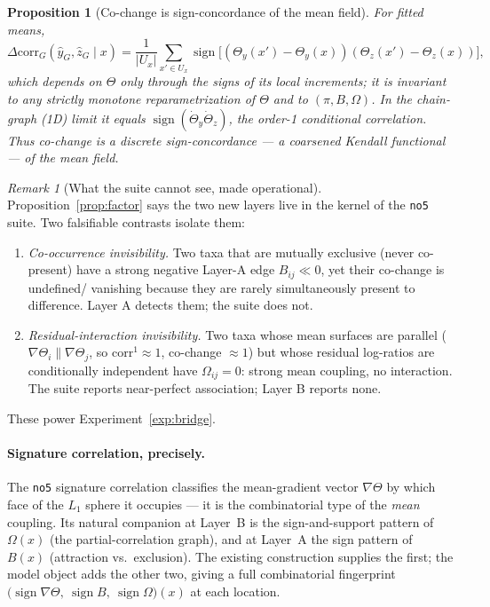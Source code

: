 \documentclass[11pt]{article}
\theoremstyle{definition}
\theoremstyle{plain}
\newtheorem{proposition}[definition]{Proposition}
\theoremstyle{remark}
\newtheorem{remark}[definition]{Remark}
\newcommand{\sign}{\operatorname{sign}}
\newcommand{\1}{\mathbf{1}}
\newcommand{\Prec}{\Omega}
\newcommand{\Pres}{\pi}
\newcommand{\Edge}{B}
\newcommand{\dcorr}{\Delta\mathrm{corr}}
\begin{document}
\begin{proposition}[Co-change is sign-concordance of the mean field]\label{prop:cochange}
For fitted means,
\[
  \dcorr_G(\widehat y_G,\widehat z_G\mid x)=\frac{1}{|U_x|}
  \sum_{x'\in U_x}\sign\!\big[(\Theta_y(x')-\Theta_y(x))
                                (\Theta_z(x')-\Theta_z(x))\big],
\]
which depends on $\Theta$ only through the \emph{signs} of its local increments;
it is invariant to any strictly monotone reparametrization of $\Theta$ and to
$(\Pres,\Edge,\Prec)$. In the chain-graph (1D) limit it equals
$\sign(\dot\Theta_y\dot\Theta_z)$, the order-1 conditional correlation. Thus
co-change is a discrete sign-concordance --- a coarsened Kendall functional --- of
the mean field.
\end{proposition}

\begin{remark}[What the suite cannot see, made operational]\label{rem:blind}
Proposition~\ref{prop:factor} says the two new layers live in the kernel of the
\texttt{no5} suite. Two falsifiable contrasts isolate them:
\begin{enumerate}[label=(\alph*)]
\item \emph{Co-occurrence invisibility.} Two taxa that are mutually exclusive
  (never co-present) have a strong negative Layer-A edge $\Edge_{ij}\ll0$, yet
  their co-change is undefined/ vanishing because they are rarely simultaneously
  present to difference. Layer A detects them; the suite does not.
\item \emph{Residual-interaction invisibility.} Two taxa whose mean surfaces are
  parallel ($\nabla\Theta_i\parallel\nabla\Theta_j$, so
  $\mathrm{corr}^1\approx1$, co-change $\approx1$) but whose residual log-ratios
  are conditionally independent have $\Prec_{ij}=0$: strong mean coupling, no
  interaction. The suite reports near-perfect association; Layer B reports none.
\end{enumerate}
These power Experiment~\ref{exp:bridge}.
\end{remark}

\paragraph{Signature correlation, precisely.}
The \texttt{no5} signature correlation classifies the mean-gradient vector
$\nabla\Theta$ by which face of the $L_1$ sphere it occupies --- it is the
combinatorial type of the \emph{mean} coupling. Its natural companion at Layer~B
is the sign-and-support pattern of $\Prec(x)$ (the partial-correlation graph),
and at Layer~A the sign pattern of $\Edge(x)$ (attraction vs.\ exclusion). The
existing construction supplies the first; the model object adds the other two,
giving a full combinatorial fingerprint
$\big(\sign\nabla\Theta,\ \sign\Edge,\ \sign\Prec\big)(x)$ at each location.
\end{document}
